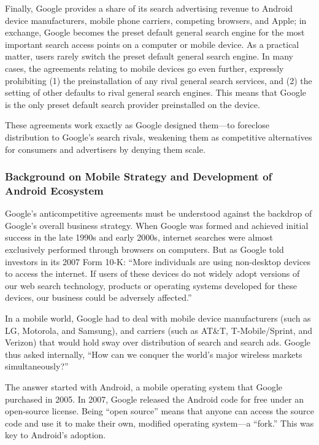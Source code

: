 \documentclass[11pt,b5paper,headings=small]{scrartcl}
\begin{document}

Finally, Google provides a share of its search advertising revenue to Android
device manufacturers, mobile phone carriers, competing browsers, and Apple; in exchange,
Google becomes the preset default general search engine for the most important search access
points on a computer or mobile device. As a practical matter, users rarely switch the preset
default general search engine. In many cases, the agreements relating to mobile devices go even
further, expressly prohibiting (1) the preinstallation of any rival general search services, and (2)
the setting of other defaults to rival general search engines. This means that Google is the only
preset default search provider preinstalled on the device.


These agreements work exactly as Google designed them—to foreclose
distribution to Google’s search rivals, weakening them as competitive alternatives for consumers
and advertisers by denying them scale.




\subsubsection{Background on Mobile Strategy and Development of Android Ecosystem}
Google’s anticompetitive agreements must be understood against the backdrop of
Google’s overall business strategy. When Google was formed and achieved initial success in the
late 1990s and early 2000s, internet searches were almost exclusively performed through
browsers on computers. But as Google told investors in its 2007 Form 10-K: “More individuals
are using non-desktop devices to access the internet. If users of these devices do not widely
adopt versions of our web search technology, products or operating systems developed for these
devices, our business could be adversely affected.”


In a mobile world, Google had to deal with mobile device manufacturers (such as
LG, Motorola, and Samsung), and carriers (such as AT\&T, T-Mobile/Sprint, and Verizon) that
would hold sway over distribution of search and search ads. Google thus asked internally, “How
can we conquer the world’s major wireless markets simultaneously?”


The answer started with Android, a mobile operating system that Google
purchased in 2005. In 2007, Google released the Android code for free under an open-source
license. Being “open source” means that anyone can access the source code and use it to make
their own, modified operating system—a “fork.” This was key to Android’s adoption.
\end{document}
